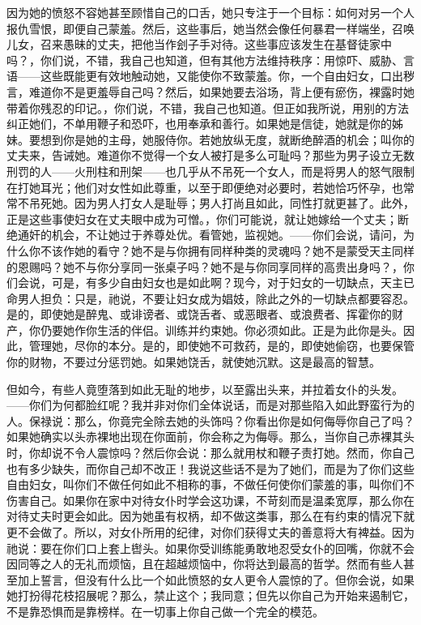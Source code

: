 因为她的愤怒不容她甚至顾惜自己的口舌，她只专注于一个目标：如何对另一个人报仇雪恨，即便自己蒙羞。然后，这些事后，她当然会像任何暴君一样端坐，召唤儿女，召来愚昧的丈夫，把他当作刽子手对待。这些事应该发生在基督徒家中吗？，你们说，不错，我自己也知道，但有其他方法维持秩序：用惊吓、威胁、言语——这些既能更有效地触动她，又能使你不致蒙羞。你，一个自由妇女，口出秽言，难道你不是更羞辱自己吗？然后，如果她要去浴场，背上便有瘀伤，裸露时她带着你残忍的印记。，你们说，不错，我自己也知道。但正如我所说，用别的方法纠正她们，不单用鞭子和恐吓，也用奉承和善行。如果她是信徒，她就是你的姊妹。要想到你是她的主母，她服侍你。若她放纵无度，就断绝醉酒的机会；叫你的丈夫来，告诫她。难道你不觉得一个女人被打是多么可耻吗？那些为男子设立无数刑罚的人——火刑柱和刑架——也几乎从不吊死一个女人，而是将男人的怒气限制在打她耳光；他们对女性如此尊重，以至于即便绝对必要时，若她恰巧怀孕，也常常不吊死她。因为男人打女人是耻辱；男人打尚且如此，同性打就更甚了。此外，正是这些事使妇女在丈夫眼中成为可憎。，你们可能说，就让她嫁给一个丈夫；断绝通奸的机会，不让她过于养尊处优。看管她，监视她。——你们会说，请问，为什么你不该作她的看守？她不是与你拥有同样种类的灵魂吗？她不是蒙受天主同样的恩赐吗？她不与你分享同一张桌子吗？她不是与你同享同样的高贵出身吗？，你们会说，可是，有多少自由妇女也是如此啊？现今，对于妇女的一切缺点，天主已命男人担负：只是，祂说，不要让妇女成为娼妓，除此之外的一切缺点都要容忍。是的，即使她是醉鬼、或诽谤者、或饶舌者、或恶眼者、或浪费者、挥霍你的财产，你仍要她作你生活的伴侣。训练并约束她。你必须如此。正是为此你是头。因此，管理她，尽你的本分。是的，即使她不可救药，是的，即使她偷窃，也要保管你的财物，不要过分惩罚她。如果她饶舌，就使她沉默。这是最高的智慧。\par

但如今，有些人竟堕落到如此无耻的地步，以至露出头来，并拉着女仆的头发。——你们为何都脸红呢？我并非对你们全体说话，而是对那些陷入如此野蛮行为的人。保禄说：那么，你竟完全除去她的头饰吗？你看出你是如何侮辱你自己了吗？如果她确实以头赤裸地出现在你面前，你会称之为侮辱。那么，当你自己赤裸其头时，你却说不令人震惊吗？然后你会说：那么就用杖和鞭子责打她。然而，你自己也有多少缺失，而你自己却不改正！我说这些话不是为了她们，而是为了你们这些自由妇女，叫你们不做任何如此不相称的事，不做任何使你们蒙羞的事，叫你们不伤害自己。如果你在家中对待女仆时学会这功课，不苛刻而是温柔宽厚，那么你在对待丈夫时更会如此。因为她虽有权柄，却不做这类事，那么在有约束的情况下就更不会做了。所以，对女仆所用的纪律，对你们获得丈夫的善意将大有裨益。因为祂说：要在你们口上套上辔头。如果你受训练能勇敢地忍受女仆的回嘴，你就不会因同等之人的无礼而烦恼，且在超越烦恼中，你将达到最高的哲学。然而有些人甚至加上誓言，但没有什么比一个如此愤怒的女人更令人震惊的了。但你会说，如果她打扮得花枝招展呢？那么，禁止这个；我同意；但先以你自己为开始来遏制它，不是靠恐惧而是靠榜样。在一切事上你自己做一个完全的模范。\par

